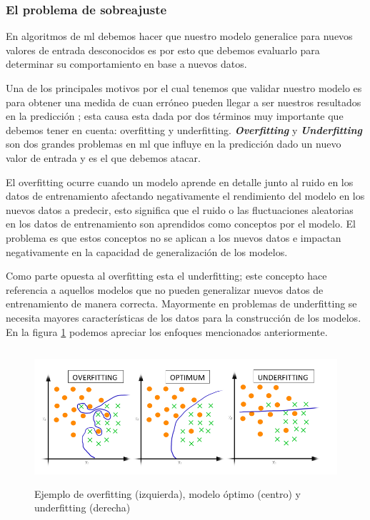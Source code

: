 \subsubsection{El problema de sobreajuste}\label{sub:validacion-modelo}

En algoritmos de \ac{ml} debemos hacer que nuestro modelo generalice para nuevos valores de entrada desconocidos es por esto que debemos evaluarlo para determinar su comportamiento en base a nuevos datos. 

Una de los principales motivos por el cual tenemos que validar nuestro modelo es para obtener una medida de cuan erróneo pueden llegar a ser nuestros resultados en la predicción ; esta causa esta dada por dos términos muy importante que debemos tener en cuenta: overfitting y underfitting. \textit{\textbf{Overfitting}} y \textit{\textbf{Underfitting}} son dos grandes problemas en \ac{ml} que influye en la predicción dado un nuevo valor de entrada y es el que debemos atacar. 

El overfitting ocurre cuando un modelo aprende en detalle junto al ruido en los datos de entrenamiento afectando negativamente el rendimiento del modelo en los nuevos datos a predecir, esto significa que el ruido o las fluctuaciones aleatorias en los datos de entrenamiento son aprendidos como conceptos por el modelo. El problema es que estos conceptos no se aplican a los nuevos datos e impactan negativamente en la capacidad de generalización de los modelos.

Como parte opuesta al overfitting esta el  underfitting; este concepto hace referencia a aquellos modelos que no pueden generalizar nuevos datos de entrenamiento de manera correcta. Mayormente en problemas de underfitting se necesita mayores características de los datos para la construcción de los modelos. En la figura \ref{Fig: overUnder} podemos apreciar los enfoques mencionados anteriormente.

\begin{figure}[h]
 \centering
  \includegraphics[height=5cm,keepaspectratio=true,clip=true]{imagenes/MarcoTeorico/OverFUnderF.png}
  \caption{Ejemplo de overfitting (izquierda), modelo óptimo (centro) y underfitting (derecha)}
	\label{Fig: overUnder}
\end{figure}



